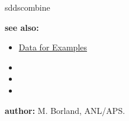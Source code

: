 \begin{sddsprog}{sddscombine}
  \item \textbf{see also:}
    \begin{itemize}
      \item \hyperref[exampleData]{Data for Examples}
      \item {}
      \item {}
      \item {}
    \end{itemize}

  \item \textbf{author:} M. Borland, ANL/APS.
\end{sddsprog}
